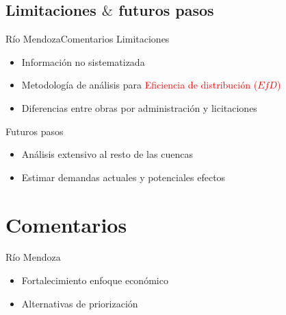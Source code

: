 \documentclass{beamer}\usepackage[]{graphicx}\usepackage[]{color}
\begin{document}




\subsection{Limitaciones $\&$ futuros pasos}
\begin{frame}{Río Mendoza}{Comentarios}
  Limitaciones
  \begin{itemize}
         \item Información no sistematizada          
  \pause \item Metodología de análisis para \textcolor{red}{Eficiencia de distribución ($EfD$)}
  \pause \item Diferencias entre obras por administración y licitaciones
  \end{itemize}
  
  Futuros pasos
  \begin{itemize}
  \pause \item Análisis extensivo al resto de las cuencas
  \pause \item Estimar demandas actuales y potenciales efectos
  \end{itemize}
\end{frame}

\section*{Comentarios}
\begin{frame}{Río Mendoza}
  \begin{itemize}
  \item Fortalecimiento enfoque económico
\pause \item Alternativas de priorización
  \end{itemize}
\end{frame}
\end{document}
